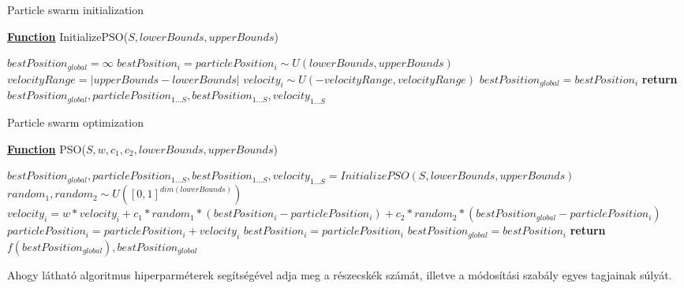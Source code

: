 
\begin{algorithm}[H]
\caption{Particle swarm initialization}
\label{alg:pso} 
\textbf{\underline{Function}} InitializePSO($S, lowerBounds, upperBounds$)
\begin{algorithmic}[1] %
\STATE $bestPosition_{global} = \infty$
	\STATE $bestPosition_i = particlePosition_i \sim U(lowerBounds, upperBounds)$
	\STATE $velocityRange = |upperBounds-lowerBounds|$
	\STATE $velocity_i \sim U(-velocityRange, velocityRange)$
		\STATE $bestPosition_{global} = bestPosition_i$
	\ENDIF
\ENDFOR
\STATE \textbf{return} $bestPosition_{global}, particlePosition_{1 \ldots S}, bestPosition_{1 \ldots S}, velocity_{1 \ldots S}$
\end{algorithmic}
\end{algorithm}

\begin{algorithm}[H]
\caption{Particle swarm optimization}
\label{alg:pso} 
\textbf{\underline{Function}} PSO($S, w, c_1, c_2, lowerBounds, upperBounds$)
\begin{algorithmic}[1] %
\STATE $bestPosition_{global}, particlePosition_{1 \ldots S}, bestPosition_{1 \ldots S}, velocity_{1 \ldots S} = InitializePSO(S, lowerBounds, upperBounds)$
		\STATE $random_1, random_2 \sim U([0,1]^{dim(lowerBounds)})$
		\STATE $velocity_i = w*velocity_i + c_1*random_1*(bestPosition_i-particlePosition_i) + c_2*random_2*(bestPosition_{global}-particlePosition_i)$
		\STATE $particlePosition_i = particlePosition_i + velocity_i$ 
			\STATE $bestPosition_i = particlePosition_i$
				\STATE $bestPosition_{global} = bestPosition_i$
			\ENDIF
		\ENDIF
	\ENDFOR
\ENDWHILE
\STATE \textbf{return} $f(bestPosition_{global}), bestPosition_{global}$
\end{algorithmic}
\end{algorithm}


Ahogy látható algoritmus hiperparméterek segítségével adja meg a részecskék számát, illetve a módosítási szabály egyes tagjainak súlyát. %

